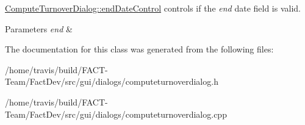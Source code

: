 \hyperlink{classGui_1_1Dialogs_1_1ComputeTurnoverDialog_aec195a2ea796179dbf584dd806077164}{Compute\-Turnover\-Dialog\-::end\-Date\-Control} controls if the {\itshape end} date field is valid. 


\begin{DoxyParams}{Parameters}
{\em end} & \\
\hline
\end{DoxyParams}


The documentation for this class was generated from the following files\-:\begin{DoxyCompactItemize}
\item 
/home/travis/build/\-F\-A\-C\-T-\/\-Team/\-Fact\-Dev/src/gui/dialogs/computeturnoverdialog.\-h\item 
/home/travis/build/\-F\-A\-C\-T-\/\-Team/\-Fact\-Dev/src/gui/dialogs/computeturnoverdialog.\-cpp\end{DoxyCompactItemize}
